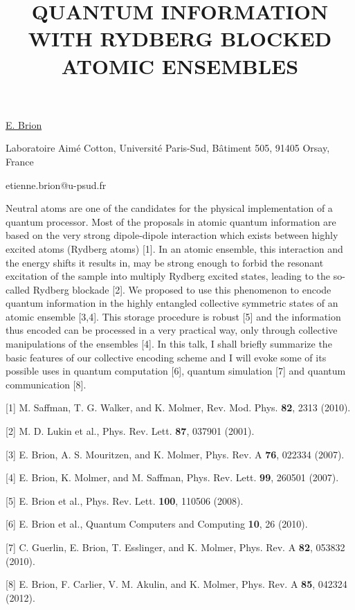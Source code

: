 \title{QUANTUM INFORMATION WITH RYDBERG BLOCKED ATOMIC ENSEMBLES}

\underline{E. Brion} 

{\normalsize{\vspace{-4mm}
Laboratoire Aim\'e Cotton, Universit\'e Paris-Sud, B\^atiment 505, 91405 Orsay, France

\email etienne.brion@u-psud.fr}}

Neutral atoms are one of the candidates for the physical implementation
of a quantum processor. Most of the proposals in atomic quantum information
are based on the very strong dipole-dipole interaction which exists
between highly excited atoms (Rydberg atoms) [1]. In an
atomic ensemble, this interaction \textendash{} and the energy shifts
it results in, may be strong enough to forbid the resonant excitation
of the sample into multiply Rydberg excited states, leading to the
so-called Rydberg blockade [2]. We proposed to use this
phenomenon to encode quantum information in the highly entangled collective
symmetric states of an atomic ensemble [3,4]. This storage
procedure is robust [5] and the information thus encoded
can be processed in a very practical way, only through collective
manipulations of the ensembles [4]. In this talk, I shall
briefly summarize the basic features of our collective encoding scheme
and I will evoke some of its possible uses in quantum computation
[6], quantum simulation [7] and quantum communication [8].

{\normalsize
[1] M. Saffman, T. G. Walker, and K. Molmer, Rev. Mod. Phys. \textbf{82}, 2313 (2010).
\vsp

[2] M. D. Lukin et al., Phys. Rev. Lett. \textbf{87}, 037901 (2001).
\vsp

[3] E. Brion, A. S. Mouritzen, and K. Molmer, Phys. Rev. A \textbf{76}, 022334 (2007).
\vsp

[4] E. Brion, K. Molmer, and M. Saffman, Phys. Rev. Lett. \textbf{99}, 260501 (2007).
\vsp

[5] E. Brion et al., Phys. Rev. Lett. \textbf{100}, 110506 (2008).
\vsp

[6] E. Brion et al., Quantum Computers and Computing \textbf{10}, 26 (2010).
\vsp

[7] C. Guerlin, E. Brion, T. Esslinger, and K. Molmer, Phys. Rev. A \textbf{82}, 053832 (2010).
\vsp

[8] E. Brion, F. Carlier, V. M. Akulin, and K. Molmer, Phys. Rev. A \textbf{85}, 042324 (2012).
}

\vspace{\baselineskip}
